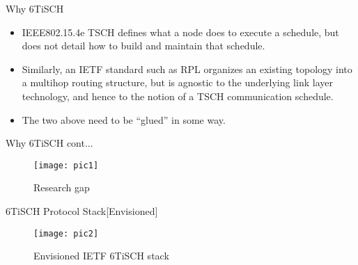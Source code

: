 \documentclass{beamer}
\begin{document}
\begin{frame}{Why 6TiSCH}
  \begin{itemize}
  \item {
    IEEE802.15.4e TSCH defines what a node does to execute a schedule, but does not detail how to build and maintain that schedule.
  }
  \item {   
    Similarly, an IETF standard such as RPL organizes an existing topology into a multihop routing structure, but is agnostic to the underlying link layer technology, and hence to the notion of a TSCH communication schedule.
  }
  \item{
    The two above need to be “glued” in some way.
  }
  \end{itemize}
\end{frame}
\begin{frame}{Why 6TiSCH cont...}
	\begin{figure}
\centering
\texttt{[image: pic1]}
\caption{Research gap}
\label{fig:pic1}
\end{figure}
\end{frame}
\begin{frame}{6TiSCH Protocol Stack[Envisioned]}
 \begin{figure}
\centering
\texttt{[image: pic2]}
\caption{Envisioned IETF 6TiSCH stack}
\label{fig:pic2}
\end{figure}
\end{frame}
\end{document}
